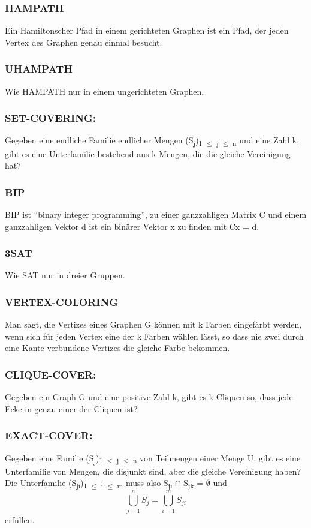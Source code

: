 \documentclass[11pt,twoside,landscape]{article}
\begin{document}
\begin{multicols}{2}
\subsubsection{HAMPATH}
\label{sec:org531fce4}
Ein Hamiltonscher Pfad in einem gerichteten Graphen ist ein Pfad, der jeden Vertex des Graphen genau einmal besucht.
\subsubsection{UHAMPATH}
\label{sec:org9311cd4}
Wie HAMPATH nur in einem ungerichteten Graphen. 
\subsubsection{SET-COVERING:}
\label{sec:orgcbce2f7}
Gegeben eine endliche Familie endlicher Mengen (S\textsubscript{j})\textsubscript{1 \(\le\) j \(\le\) n} und eine Zahl k, gibt es eine Unterfamilie bestehend aus k Mengen, die die gleiche Vereinigung hat?

\subsubsection{BIP}
\label{sec:orgb05b8e7}
BIP ist “binary integer programming”, zu einer ganzzahligen Matrix C und einem ganzzahligen Vektor d ist ein binärer Vektor x zu finden mit Cx = d.
\subsubsection{3SAT}
\label{sec:org55dad41}
Wie SAT nur in dreier Gruppen.
\subsubsection{VERTEX-COLORING}
\label{sec:orge94c1ce}
Man sagt, die Vertizes eines Graphen G können mit k Farben eingefärbt werden, wenn sich für jeden Vertex eine der k Farben wählen lässt, so dass nie zwei durch eine Kante verbundene Vertizes die gleiche Farbe bekommen.
\subsubsection{CLIQUE-COVER:}
\label{sec:orgb86c909}
Gegeben ein Graph G und eine positive Zahl k, gibt es k Cliquen so, dass jede Ecke in genau einer der Cliquen ist?

\subsubsection{EXACT-COVER:}
\label{sec:org6e340ac}
Gegeben eine Familie (S\textsubscript{j})\textsubscript{1 \(\le\) j \(\le\) n} von Teilmengen einer Menge U, gibt es eine Unterfamilie von Mengen, die disjunkt sind, aber die gleiche Vereinigung haben? Die Unterfamilie (S\textsubscript{ji})\textsubscript{1 \(\le\) i \(\le\) m} muss also S\textsubscript{ji} \(\cap\) S\textsubscript{jk} = \(\emptyset\) und
$$
\bigcup^n_{j=1} S_j = \bigcup^m_{i=1} S_{ji}
$$
erfüllen.


\end{multicols}
\end{document}
